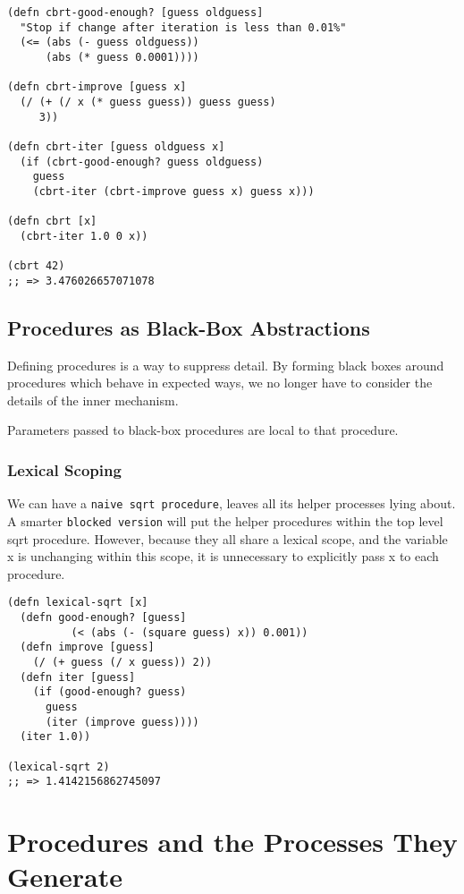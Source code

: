 \documentclass[11pt]{article}
\begin{document}
\begin{verbatim}
(defn cbrt-good-enough? [guess oldguess]
  "Stop if change after iteration is less than 0.01%"
  (<= (abs (- guess oldguess))
      (abs (* guess 0.0001))))

(defn cbrt-improve [guess x]
  (/ (+ (/ x (* guess guess)) guess guess)
     3))

(defn cbrt-iter [guess oldguess x]
  (if (cbrt-good-enough? guess oldguess)
    guess
    (cbrt-iter (cbrt-improve guess x) guess x)))

(defn cbrt [x]
  (cbrt-iter 1.0 0 x))

(cbrt 42)
;; => 3.476026657071078
\end{verbatim}

\subsection{Procedures as Black-Box Abstractions}
\label{sec-1-2}
Defining procedures is a way to suppress detail. By forming black boxes around procedures which behave in expected ways, we no longer have to consider the details of the inner mechanism.

Parameters passed to black-box procedures are local to that procedure.

\subsubsection{Lexical Scoping}
\label{sec-1-2-1}
We can have a \texttt{naive sqrt procedure}, leaves all its helper processes lying about. A smarter \texttt{blocked version} will put the helper procedures within the top level sqrt procedure. However, because they all share a lexical scope, and the variable x is unchanging within this scope, it is unnecessary to explicitly pass x to each procedure.

\begin{verbatim}
(defn lexical-sqrt [x]
  (defn good-enough? [guess]
          (< (abs (- (square guess) x)) 0.001))
  (defn improve [guess]
    (/ (+ guess (/ x guess)) 2))
  (defn iter [guess]
    (if (good-enough? guess)
      guess
      (iter (improve guess))))
  (iter 1.0))

(lexical-sqrt 2)
;; => 1.4142156862745097
\end{verbatim}

\section{Procedures and the Processes They Generate}
\label{sec-2}
\end{document}
